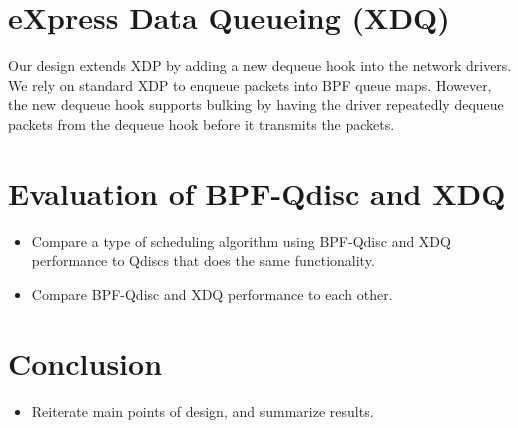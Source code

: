 \documentclass[sigconf, nonacm]{acmart}
\begin{document}
\section{eXpress Data Queueing (XDQ)}

Our design extends XDP by adding a new dequeue hook into the network drivers. We rely on standard XDP to enqueue packets into BPF queue maps. However, the new dequeue hook supports bulking by having the driver repeatedly dequeue packets from the dequeue hook before it transmits the packets.


\section{Evaluation of BPF-Qdisc and XDQ}

\begin{itemize}
  \item Compare a type of scheduling algorithm using BPF-Qdisc and XDQ performance to Qdiscs that does the same functionality.
  \item Compare BPF-Qdisc and XDQ performance to each other.
\end{itemize}

\section{Conclusion}

\begin{itemize}
  \item Reiterate main points of design, and summarize results.
\end{itemize}





\end{document}
